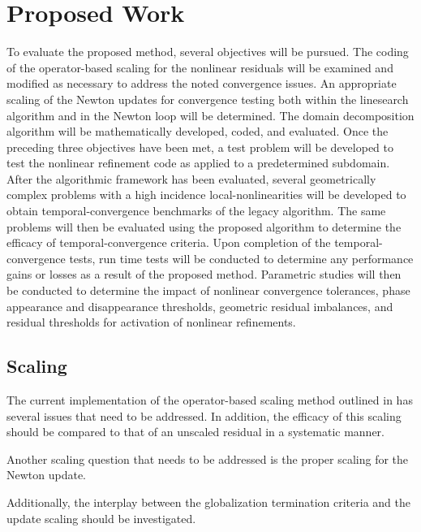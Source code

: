 \chapter{Proposed Work}
\label{chap:proposal}
To evaluate the proposed method, several objectives will be pursued.
The coding of the operator-based scaling for the nonlinear residuals will be examined and modified as necessary to address the noted convergence issues.
An appropriate scaling of the Newton updates for convergence testing both within the linesearch algorithm and in the Newton loop will be determined.
The domain decomposition algorithm will be mathematically developed, coded, and evaluated.
Once the preceding three objectives have been met, a test problem will be developed to test the nonlinear refinement code as applied to a predetermined subdomain.
After the algorithmic framework has been evaluated, several geometrically complex problems with a high incidence local-nonlinearities will be developed to obtain temporal-convergence benchmarks of the legacy algorithm.
The same problems will then be evaluated using the proposed algorithm to determine the efficacy of temporal-convergence criteria.
Upon completion of the temporal-convergence tests, run time tests will be conducted to determine any performance gains or losses as a result of the proposed method.
Parametric studies will then be conducted to determine the impact of nonlinear convergence tolerances, phase appearance and disappearance thresholds, geometric residual imbalances, and residual thresholds for activation of nonlinear refinements.

\section{Scaling}
\label{sect:proposal_scaling}
The current implementation of the operator-based scaling method outlined in  has several issues that need to be addressed.
In addition, the efficacy of this scaling should be compared to that of an unscaled residual in a systematic manner.

Another scaling question that needs to be addressed is the proper scaling for the Newton update.

Additionally, the interplay between the globalization termination criteria and the update scaling should be investigated. 

